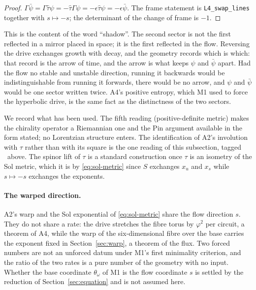 \begin{proof}
$\Gamma\bar\psi=\Gamma\hat\tau\psi=-\hat\tau\Gamma\psi=-\epsilon\hat\tau\psi
=-\epsilon\bar\psi$. The frame statement is \texttt{L4\_swap\_lines} together
with $s\mapsto-s$; the determinant of the change of frame is $-1$. \rigR
\end{proof}

This is the content of the word ``shadow''. The second sector is not the
first reflected in a mirror placed in space; it is the first reflected in the
flow. Reversing the drive exchanges growth with decay, and the geometry
records which is which: that record is the arrow of time, and the arrow is
what keeps $\psi$ and $\bar\psi$ apart. Had the flow no stable and unstable
direction, running it backwards would be indistinguishable from running it
forwards, there would be no arrow, and $\psi$ and $\bar\psi$ would be one
sector written twice. A4's positive entropy, which M1 used to force the
hyperbolic drive, is the same fact as the distinctness of the two sectors.

We record what has been used. The fifth reading (positive-definite metric)
makes the chirality operator a Riemannian one and the Pin argument available
in the form stated; no Lorentzian structure enters. The identification of
A2's involution with $\tau$ rather than with its square is the one
reading of this subsection, tagged \rigD\ above. The spinor lift of $\tau$
is a standard construction once $\tau$ is an isometry of the Sol metric,
which it is by \eqref{eq:sol-metric} since $S$ exchanges $x_{u}$ and
$x_{s}$ while $s\mapsto-s$ exchanges the exponents.

\paragraph{The warped direction.}
A2's warp and the Sol exponential of \eqref{eq:sol-metric} share the flow
direction $s$. They do not share a rate: the drive stretches the fibre torus
by $\varphi^{2}$ per circuit, a theorem of A4, while the warp of the
six-dimensional fibre over the base carries the exponent fixed in
Section~\ref{sec:warp}, a theorem of the flux. Two forced numbers are not an unforced
datum under M1's first minimality criterion, and the ratio of the two rates
is a pure number of the geometry with no input. Whether the base coordinate
$\theta_{\omega}$ of M1 is the flow coordinate $s$ is settled by the
reduction of Section~\ref{sec:equation} and is not assumed here. \rigM
